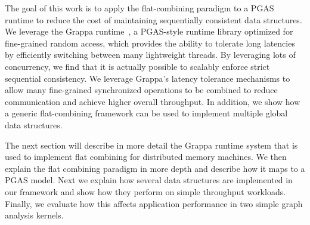 The goal of this work is to apply the flat-combining paradigm to a PGAS runtime to reduce the cost of maintaining sequentially consistent data structures.
We leverage the Grappa runtime~\cite{Nelson:hotpar11-real}, a PGAS-style runtime library optimized for fine-grained random access, which provides the ability to tolerate long latencies by efficiently switching between many lightweight threads.
By leveraging lots of concurrency, we find that it is actually possible to scalably enforce strict sequential consistency. We leverage Grappa's latency tolerance mechanisms to allow many fine-grained synchronized operations to be combined to reduce communication and achieve higher overall throughput.
In addition, we show how a generic flat-combining framework can be used to implement multiple global data structures.

The next section will describe in more detail the Grappa runtime system that is used to implement flat combining for distributed memory machines. We then explain the flat combining paradigm in more depth and describe how it maps to a PGAS model. Next we explain how several data structures are implemented in our framework and show how they perform on simple throughput workloads. Finally, we evaluate how this affects application performance in two simple graph analysis kernels.
